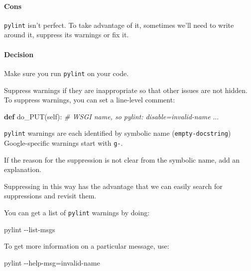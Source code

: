 \documentclass[
]{article}
\newenvironment{Shaded}{}{}
\newcommand{\CommentTok}[1]{\textcolor[rgb]{0.38,0.63,0.69}{\textit{#1}}}
\newcommand{\KeywordTok}[1]{\textcolor[rgb]{0.00,0.44,0.13}{\textbf{#1}}}
\newcommand{\NormalTok}[1]{#1}
\newcommand{\VariableTok}[1]{\textcolor[rgb]{0.10,0.09,0.49}{#1}}
\begin{document}
\paragraph{Cons}

\texttt{pylint} isn't perfect. To take advantage of it, sometimes we'll
need to write around it, suppress its warnings or fix it.

\paragraph{Decision}

Make sure you run \texttt{pylint} on your code.

Suppress warnings if they are inappropriate so that other issues are not
hidden. To suppress warnings, you can set a line-level comment:

\begin{samepage}
\begin{Shaded}
\begin{Highlighting}[]
\KeywordTok{def}\NormalTok{ do\_PUT(}\VariableTok{self}\NormalTok{):  }\CommentTok{\# WSGI name, so pylint: disable=invalid{-}name}
\NormalTok{  ...}
\end{Highlighting}
\end{Shaded}
\end{samepage}

\texttt{pylint} warnings are each identified by symbolic name
(\texttt{empty-docstring}) Google-specific warnings start with
\texttt{g-}.

If the reason for the suppression is not clear from the symbolic name,
add an explanation.

Suppressing in this way has the advantage that we can easily search for
suppressions and revisit them.

You can get a list of \texttt{pylint} warnings by doing:

\begin{samepage}
\begin{Shaded}
\begin{Highlighting}[]
\NormalTok{pylint {-}{-}list{-}msgs}
\end{Highlighting}
\end{Shaded}
\end{samepage}

To get more information on a particular message, use:

\begin{samepage}
\begin{Shaded}
\begin{Highlighting}[]
\NormalTok{pylint {-}{-}help{-}msg=invalid{-}name}
\end{Highlighting}
\end{Shaded}
\end{samepage}
\end{document}
